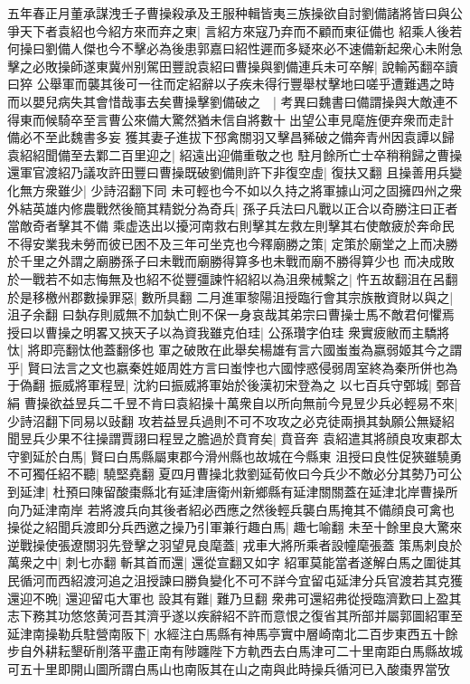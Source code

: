 五年春正月董承謀洩壬子曹操殺承及王服种輯皆夷三族操欲自討劉備諸將皆曰與公爭天下者袁紹也今紹方來而弃之東|{
	言紹方來寇乃弃而不顧而東征備也}
紹乘人後若何操曰劉備人傑也今不擊必為後患郭嘉曰紹性遲而多疑來必不速備新起衆心未附急擊之必敗操師遂東冀州别駕田豐說袁紹曰曹操與劉備連兵未可卒解|{
	說輸芮翻卒讀曰猝}
公舉軍而襲其後可一往而定紹辭以子疾未得行豐舉杖擊地曰嗟乎遭難遇之時而以嬰兒病失其會惜哉事去矣曹操擊劉備破之　|{
	考異曰魏書曰備謂操與大敵連不得東而候騎卒至言曹公來備大驚然猶未信自將數十出望公車見麾旌便弃衆而走計備必不至此魏書多妄}
獲其妻子進拔下邳禽關羽又擊昌豨破之備奔青州因袁譚以歸袁紹紹聞備至去鄴二百里迎之|{
	紹遠出迎備重敬之也}
駐月餘所亡士卒稍稍歸之曹操還軍官渡紹乃議攻許田豐曰曹操既破劉備則許下非復空虛|{
	復扶又翻}
且操善用兵變化無方衆雖少|{
	少詩沼翻下同}
未可輕也今不如以久持之將軍據山河之固擁四州之衆外結英雄内修農戰然後簡其精鋭分為奇兵|{
	孫子兵法曰凡戰以正合以奇勝注曰正者當敵奇者擊其不備}
乘虚迭出以擾河南救右則擊其左救左則擊其右使敵疲於奔命民不得安業我未勞而彼已困不及三年可坐克也今釋廟勝之策|{
	定策於廟堂之上而决勝於千里之外謂之廟勝孫子曰未戰而廟勝得算多也未戰而廟不勝得算少也}
而决成敗於一戰若不如志悔無及也紹不從豐彊諫忤紹紹以為沮衆械繫之|{
	忤五故翻沮在呂翻}
於是移檄州郡數操罪惡|{
	數所具翻}
二月進軍黎陽沮授臨行會其宗族散資財以與之|{
	沮子余翻}
曰埶存則威無不加埶亡則不保一身哀哉其弟宗曰曹操士馬不敵君何懼焉授曰以曹操之明畧又挾天子以為資我雖克伯珪|{
	公孫瓚字伯珪}
衆實疲敝而主驕將忲|{
	將即亮翻忲他蓋翻侈也}
軍之破敗在此舉矣楊雄有言六國蚩蚩為嬴弱姬其今之謂乎|{
	賢曰法言之文也嬴秦姓姬周姓方言曰蚩悖也六國悖惑侵弱周室終為秦所併也為于偽翻}
振威將軍程昱|{
	沈約曰振威將軍始於後漢初宋登為之}
以七百兵守鄄城|{
	鄄音絹}
曹操欲益昱兵二千昱不肯曰袁紹操十萬衆自以所向無前今見昱少兵必輕易不來|{
	少詩沼翻下同易以䜴翻}
攻若益昱兵過則不可不攻攻之必克徒兩損其埶願公無疑紹聞昱兵少果不往操謂賈詡曰程昱之膽過於賁育矣|{
	賁音奔}
袁紹遣其將顔良攻東郡太守劉延於白馬|{
	賢曰白馬縣屬東郡今滑州縣也故城在今縣東}
沮授曰良性促狹雖驍勇不可獨任紹不聽|{
	驍堅堯翻}
夏四月曹操北救劉延荀攸曰今兵少不敵必分其勢乃可公到延津|{
	杜預曰陳留酸棗縣北有延津唐衛州新鄉縣有延津關關蓋在延津北岸曹操所向乃延津南岸}
若將渡兵向其後者紹必西應之然後輕兵襲白馬掩其不備顔良可禽也操從之紹聞兵渡即分兵西邀之操乃引軍兼行趣白馬|{
	趣七喻翻}
未至十餘里良大驚來逆戰操使張遼關羽先登擊之羽望見良麾蓋|{
	戎車大將所乘者設幢麾張蓋}
策馬刺良於萬衆之中|{
	刺七亦翻}
斬其首而還|{
	還從宣翻又如字}
紹軍莫能當者遂解白馬之圍徙其民循河而西紹渡河追之沮授諫曰勝負變化不可不詳今宜留屯延津分兵官渡若其克獲還迎不晩|{
	還迎留屯大軍也}
設其有難|{
	難乃旦翻}
衆弗可還紹弗從授臨濟歎曰上盈其志下務其功悠悠黄河吾其濟乎遂以疾辭紹不許而意恨之復省其所部并屬郭圖紹軍至延津南操勒兵駐營南阪下|{
	水經注白馬縣有神馬亭實中層崎南北二百步東西五十餘步自外耕耘墾斫削落平盡正南有陟躔陛下方軌西去白馬津可二十里南距白馬縣故城可五十里即開山圖所謂白馬山也南阪其在山之南與此時操兵循河已入酸棗界當攷}
